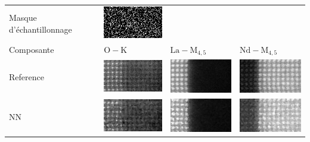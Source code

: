 \setlength{}

\begin{tabular}{m{2cm}*{3}{M{0.24\textwidth}}}
    Masque d'échantillonnage&
    \includegraphics[width=\tmplength]{img/chapitre4/figure9/img/mask.png}&
    &
    \\[30pt]
    Composante&
    {$\mathrm{O-K}$}&
    {$\mathrm{La-M}_{4, 5}$}&
    {$\mathrm{Nd-M}_{4, 5}$}\\
    Reference&
    \includegraphics[width=\tmplength]{img/chapitre4/figure9/img/GT_band_0.png}&
    \includegraphics[width=\tmplength]{img/chapitre4/figure9/img/GT_band_1.png}&
    \includegraphics[width=\tmplength]{img/chapitre4/figure9/img/GT_band_2.png}\\
    NN&
    \includegraphics[width=\tmplength]{img/chapitre4/figure9/img/NN_band_0.png}&
    \includegraphics[width=\tmplength]{img/chapitre4/figure9/img/NN_band_1.png}&
    \includegraphics[width=\tmplength]{img/chapitre4/figure9/img/NN_band_2.png}\\

\end{tabular}
